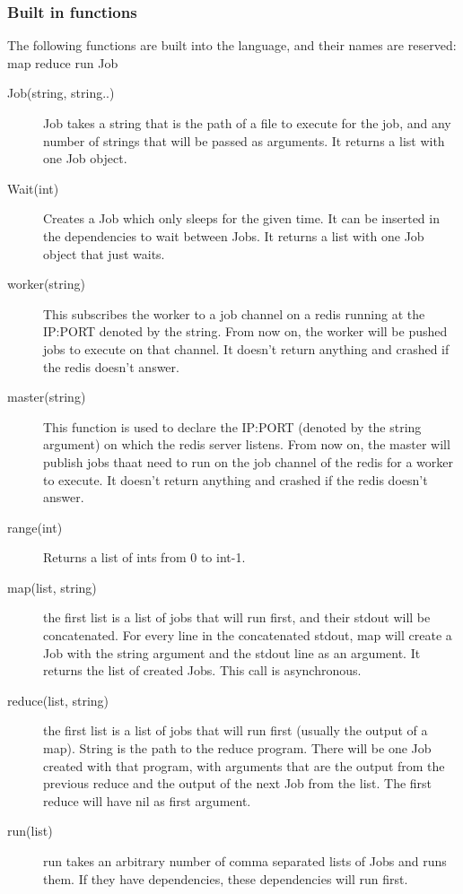 \subsubsection{Built in functions}
The following functions are built into the language, and their names are reserved:\\
map reduce run Job\\
\begin{description}
  \item[Job(string, string..)] Job takes a string that is the path of a file to
    execute for the job, and any number of strings that will be passed as
    arguments. It returns a list with one Job object.
  \item[Wait(int)] Creates a Job which only sleeps for the given time. It can be inserted
  in the dependencies to wait between Jobs. It returns a list with one Job object that just
  waits.
  \item[worker(string)] This subscribes the worker to a job channel on a redis running at
    the IP:PORT denoted by the string. From now on, the worker will be pushed jobs to
    execute on that channel. It doesn't return anything and crashed if the redis doesn't
    answer.
  \item[master(string)] This function is used to declare
    the IP:PORT (denoted by the string argument) on which the redis server listens.
    From now on, the master will publish jobs thaat need to run on the job channel of the redis
    for a worker to execute. It doesn't return anything and crashed if the redis doesn't
    answer.
  \item[range(int)] Returns a list of ints from 0 to int-1.
  \item[map(list, string)] the first list is a list of jobs that will run first, and their
    stdout will be concatenated. For every line in the concatenated stdout, map will create
    a Job with the string argument and the stdout line as an argument. It returns the list
    of created Jobs. This call is asynchronous.
  \item[reduce(list, string)] the first list is a list of jobs that will run first (usually the
    output of a map). String is the path to the reduce program. There will be one Job
    created with that program, with arguments that are the output from the previous reduce and
    the output of the next Job from the list. The first reduce will have nil as first argument.
  \item[run(list)] run takes an arbitrary number of comma separated lists of Jobs
    and runs them. If they have dependencies, these dependencies will run first.
\end{description}

